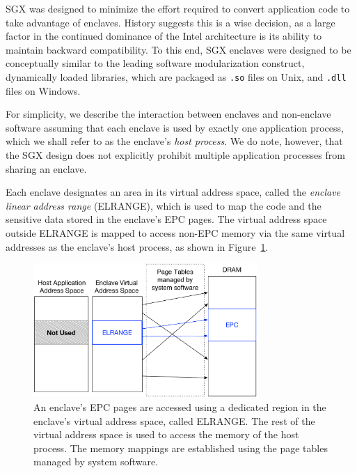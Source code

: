 \label{sec:sgx_enclave_layout}

SGX was designed to minimize the effort required to convert application code to
take advantage of enclaves. History suggests this is a wise decision, as a
large factor in the continued dominance of the Intel architecture is its
ability to maintain backward compatibility. To this end, SGX enclaves were
designed to be conceptually similar to the leading software modularization
construct, dynamically loaded libraries, which are packaged as \texttt{.so}
files on Unix, and \texttt{.dll} files on Windows.

For simplicity, we describe the interaction between enclaves and non-enclave
software assuming that each enclave is used by exactly one application process,
which we shall refer to as the enclave's \textit{host process}. We do note,
however, that the SGX design does not explicitly prohibit multiple application
processes from sharing an enclave.


\label{sec:sgx_elrange}


Each enclave designates an area in its virtual address space, called the
\textit{enclave linear address range} (ELRANGE), which is used to map the code
and the sensitive data stored in the enclave's EPC pages. The virtual address
space outside ELRANGE is mapped to access non-EPC memory via the same virtual
addresses as the enclave's host process, as shown in
Figure~\ref{fig:sgx_elrange}.

\begin{figure}[hbt]
  \centering
  \includegraphics[width=85mm]{figures/sgx_elrange.pdf}
  \caption{
    An enclave's EPC pages are accessed using a dedicated region in the
    enclave's virtual address space, called ELRANGE. The rest of the virtual
    address space is used to access the memory of the host process. The memory
    mappings are established using the page tables managed by system software.
  }
  \label{fig:sgx_elrange}
\end{figure}

